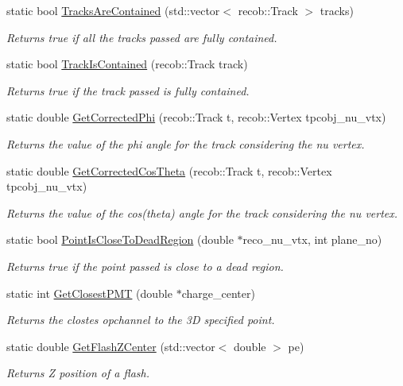 \begin{DoxyCompactItemize}
static bool \hyperlink{classUBXSecHelper_a44c8ae9d98197e81da26aeae26c70f0a}{\-Tracks\-Are\-Contained} (std\-::vector$<$ recob\-::\-Track $>$ tracks)
\begin{DoxyCompactList}\small\item\em \-Returns true if all the tracks passed are fully contained. \end{DoxyCompactList}\item 
static bool \hyperlink{classUBXSecHelper_aa0349c7d405ec64cd1b0c7ed3d54a56e}{\-Track\-Is\-Contained} (recob\-::\-Track track)
\begin{DoxyCompactList}\small\item\em \-Returns true if the track passed is fully contained. \end{DoxyCompactList}\item 
static double \hyperlink{classUBXSecHelper_a79b61783bfe19d8dcd33d6aba4c3e61a}{\-Get\-Corrected\-Phi} (recob\-::\-Track t, recob\-::\-Vertex tpcobj\-\_\-nu\-\_\-vtx)
\begin{DoxyCompactList}\small\item\em \-Returns the value of the phi angle for the track considering the nu vertex. \end{DoxyCompactList}\item 
static double \hyperlink{classUBXSecHelper_aefae2cc8a7598aa54848247ad228371e}{\-Get\-Corrected\-Cos\-Theta} (recob\-::\-Track t, recob\-::\-Vertex tpcobj\-\_\-nu\-\_\-vtx)
\begin{DoxyCompactList}\small\item\em \-Returns the value of the cos(theta) angle for the track considering the nu vertex. \end{DoxyCompactList}\item 
static bool \hyperlink{classUBXSecHelper_a7df598dfbdfdb620737fd69297e67faf}{\-Point\-Is\-Close\-To\-Dead\-Region} (double $\ast$reco\-\_\-nu\-\_\-vtx, int plane\-\_\-no)
\begin{DoxyCompactList}\small\item\em \-Returns true if the point passed is close to a dead region. \end{DoxyCompactList}\item 
static int \hyperlink{classUBXSecHelper_a88533a5a59d61351437a1fe2e54aff25}{\-Get\-Closest\-P\-M\-T} (double $\ast$charge\-\_\-center)
\begin{DoxyCompactList}\small\item\em \-Returns the clostes opchannel to the 3\-D specified point. \end{DoxyCompactList}\item 
static double \hyperlink{classUBXSecHelper_a3fd25ef568b54aded55d6c1b6a8593fa}{\-Get\-Flash\-Z\-Center} (std\-::vector$<$ double $>$ pe)
\begin{DoxyCompactList}\small\item\em \-Returns \-Z position of a flash. \end{DoxyCompactList}\end{DoxyCompactItemize}


